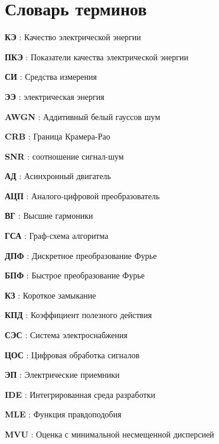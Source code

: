 \chapter*{Словарь терминов}             %

\textbf{КЭ} : Качество электрической энергии

\textbf{ПКЭ} : Показатели качества электрической энергии

\textbf{СИ} : Средства измерения

\textbf{ЭЭ} : электрическая энергия

\textbf{AWGN} : Аддитивный белый гауссов шум

\textbf{CRB} : Граница Крамера-Рао

\textbf{SNR} : соотношение сигнал-шум

\textbf{АД} : Асинхронный двигатель

\textbf{АЦП} : Аналого-цифровой преобразователь

\textbf{ВГ} : Высшие гармоники

\textbf{ГСА} : Граф-схема алгоритма 

\textbf{ДПФ} : Дискретное преобразование Фурье

\textbf{БПФ} : Быстрое преобразование Фурье

\textbf{КЗ} : Короткое замыкание

\textbf{КПД} : Коэффициент полезного действия

\textbf{СЭС} : Система электроснабжения

\textbf{ЦОС} : Цифровая обработка сигналов

\textbf{ЭП} : Электрические приемники

\textbf{IDE} : Интегрированная среда разработки

\textbf{MLE} : Функция правдоподобия 

\textbf{MVU} : Оценка с минимальной несмещенной дисперсией
